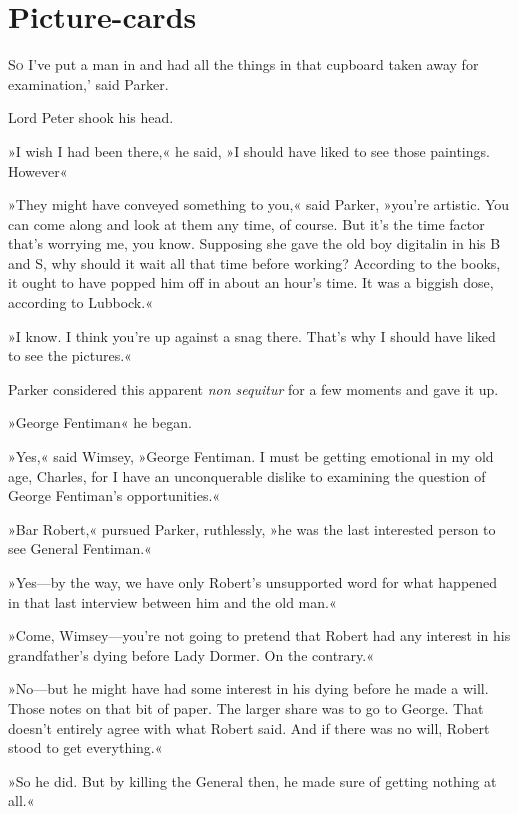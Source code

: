 \chapter{Picture-cards}

\lettrine[lines=4,ante=‘]{S}{o} I've put a man in and had all the things in that cupboard taken away for examination,' said Parker.

\zz
Lord Peter shook his head.

\zz
»I wish I had been there,« he said, »I should have liked to see those paintings. However\longdash«

»They might have conveyed something to you,« said Parker, »you're artistic. You can come along and look at them any time, of course. But it's the time factor that's worrying me, you know. Supposing she gave the old boy digitalin in his B and S, why should it wait all that time before working? According to the books, it ought to have popped him off in about an hour's time. It was a biggish dose, according to Lubbock.«

»I know. I think you're up against a snag there. That's why I should have liked to see the pictures.«

Parker considered this apparent \textit{non sequitur} for a few moments and gave it up.

»George Fentiman\longdash« he began.

»Yes,« said Wimsey, »George Fentiman. I must be getting emotional in my old age, Charles, for I have an unconquerable dislike to examining the question of George Fentiman's opportunities.«

»Bar Robert,« pursued Parker, ruthlessly, »he was the last interested person to see General Fentiman.«

»Yes\allowbreak---\allowbreak by the way, we have only Robert's unsupported word for what happened in that last interview between him and the old man.«

»Come, Wimsey\allowbreak---\allowbreak you're not going to pretend that Robert had any interest in his grandfather's dying before Lady Dormer. On the contrary.«

»No\allowbreak---\allowbreak but he might have had some interest in his dying before he made a will. Those notes on that bit of paper. The larger share was to go to George. That doesn't entirely agree with what Robert said. And if there was no will, Robert stood to get everything.«

»So he did. But by killing the General then, he made sure of getting nothing at all.«

